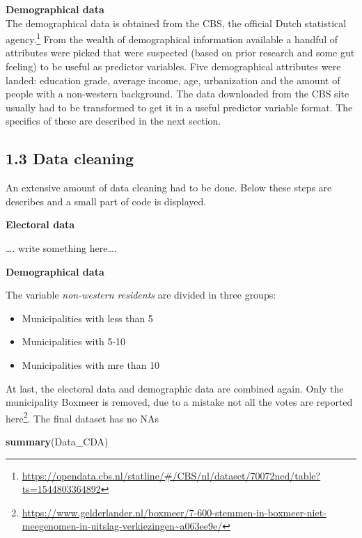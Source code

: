 \documentclass[11pt,]{article}
\newenvironment{Shaded}{\begin{snugshade}}{\end{snugshade}}
\newcommand{\KeywordTok}[1]{\textcolor[rgb]{0.13,0.29,0.53}{\textbf{#1}}}
\newcommand{\NormalTok}[1]{#1}
\let\rmarkdownfootnote\footnote%
\def\footnote{\protect\rmarkdownfootnote}
\begin{document}
\textbf{Demographical data}\\
The demographical data is obtained from the CBS, the official Dutch
statistical agency.\footnote{\url{https://opendata.cbs.nl/statline/\#/CBS/nl/dataset/70072ned/table?ts=1544803364892}}
From the wealth of demographical information available a handful of
attributes were picked that were suspected (based on prior research and
some gut feeling) to be useful as predictor variables. Five
demographical attributes were landed: education grade, average income,
age, urbanization and the amount of people with a non-western
background. The data downloaded from the CBS site usually had to be
transformed to get it in a useful predictor variable format. The
specifics of these are described in the next section.

\subsection{1.3 Data cleaning}\label{data-cleaning}

An extensive amount of data cleaning had to be done. Below these steps
are describes and a small part of code is displayed.

\textbf{Electoral data}

\ldots{}. write something here\ldots{}.

\textbf{Demographical data}

The variable \emph{non-western residents} are divided in three groups:

\begin{itemize}
\item Municipalities with less than 5 %
\item Municipalities with 5-10 %
\item Municipalities with mre than 10 %
\end{itemize}

At last, the electoral data and demographic data are combined again.
Only the municipality Boxmeer is removed, due to a mistake not all the
votes are reported here\footnote{\url{https://www.gelderlander.nl/boxmeer/7-600-stemmen-in-boxmeer-niet-meegenomen-in-uitslag-verkiezingen~a063ee9e/}}.
The final dataset has no NAs

\begin{Shaded}
\begin{Highlighting}[]
\KeywordTok{summary}\NormalTok{(Data_CDA)}
\end{Highlighting}
\end{Shaded}
\end{document}
